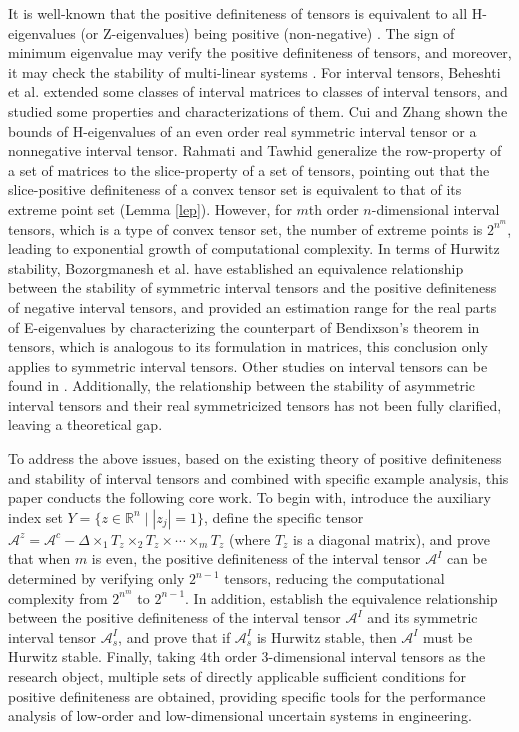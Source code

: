 \documentclass[twoside]{article}
\begin{document}
It is well-known that the positive definiteness of tensors is equivalent to all H-eigenvalues (or Z-eigenvalues) being positive (non-negative) \cite{qi2005}.  The sign of minimum eigenvalue may verify the positive definiteness of tensors, and moreover, it may check the stability of multi-linear systems \cite{qi2005,lim2005,e1,e2,e3,e4,e5,e6,e7,e8,ql2017}. For interval tensors, Beheshti et al. \cite{bf2022} extended some classes of interval matrices to classes of interval tensors, and studied some properties and characterizations of them. Cui and Zhang \cite{CZ2023} shown the bounds of H-eigenvalues of an even order real symmetric interval tensor or a nonnegative interval tensor. Rahmati and Tawhid \cite{sr2020} generalize the row-property of a set of matrices to the slice-property of a set of tensors, pointing out that the slice-positive definiteness of a convex tensor set is equivalent to that of its extreme point set (Lemma \ref{lep}). However, for $m$th order $n$-dimensional interval tensors, which is a type of convex tensor set, the number of extreme points is $2^{n^m}$, leading to exponential growth of computational complexity. In terms of Hurwitz stability, Bozorgmanesh et al. \cite{boz2020} have established an equivalence relationship between the stability of symmetric interval tensors and the positive definiteness of negative interval tensors, and provided an estimation range for the real parts of E-eigenvalues by characterizing the counterpart of Bendixson's theorem in tensors, which is analogous to its formulation in matrices, this conclusion only applies to symmetric interval tensors. Other studies on interval tensors can be found in \cite{f1,f2,f3}. Additionally, the relationship between the stability of asymmetric interval tensors and their real symmetricized tensors has not been fully clarified, leaving a theoretical gap.

To address the above issues, based on the existing theory of positive definiteness and stability of interval tensors and combined with specific example analysis, this paper conducts the following core work. To begin with, introduce the auxiliary index set $Y=\{z\in\mathbb{R}^n\mid|z_j|=1\}$, define the specific tensor $\mathcal{A}^z=\mathcal{A}^c-\Delta\times_1 T_z\times_2 T_z\times\cdots\times_m T_z$ (where $T_z$ is a diagonal matrix), and prove that when $m$ is even, the positive definiteness of the interval tensor $\mathcal{A}^I$ can be determined by verifying only $2^{n-1}$ tensors, reducing the computational complexity from $2^{n^m}$ to $2^{n-1}$. In addition, establish the equivalence relationship between the positive definiteness of the interval tensor $\mathcal{A}^I$ and its symmetric interval tensor $\mathcal{A}_s^I$, and prove that if $\mathcal{A}_s^I$ is Hurwitz stable, then $\mathcal{A}^I$ must be Hurwitz stable. Finally, taking $4$th order $3$-dimensional interval tensors as the research object, multiple sets of directly applicable sufficient conditions for positive definiteness are obtained, providing specific tools for the performance analysis of low-order and low-dimensional uncertain systems in engineering.
\end{document}
